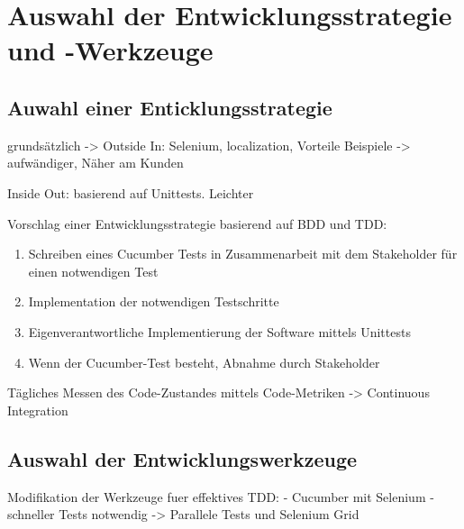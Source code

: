 \section{Auswahl der Entwicklungsstrategie und -Werkzeuge}
\subsection{Auwahl einer Enticklungsstrategie}
grundsätzlich ->
        Outside In: Selenium, localization, Vorteile Beispiele
          -> aufwändiger, Näher am Kunden

Inside Out: basierend auf Unittests. Leichter
    
    Vorschlag einer Entwicklungsstrategie basierend auf BDD und TDD:
    
    \begin{enumerate}
     \item Schreiben eines Cucumber Tests in Zusammenarbeit mit dem Stakeholder für einen notwendigen Test
     \item Implementation der notwendigen Testschritte
     \item Eigenverantwortliche Implementierung der Software mittels Unittests
     \item Wenn der Cucumber-Test besteht, Abnahme durch Stakeholder
    \end{enumerate}

    Tägliches Messen des Code-Zustandes mittels Code-Metriken -> Continuous Integration

\subsection{Auswahl der Entwicklungswerkzeuge}

Modifikation der Werkzeuge fuer effektives TDD:
      - Cucumber mit Selenium
      - schneller Tests notwendig -> Parallele Tests und Selenium Grid